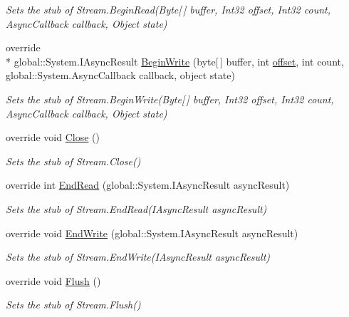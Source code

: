 \begin{DoxyCompactItemize}
\begin{DoxyCompactList}\small\item\em Sets the stub of Stream.\-Begin\-Read(\-Byte\mbox{[}$\,$\mbox{]} buffer, Int32 offset, Int32 count, Async\-Callback callback, Object state)\end{DoxyCompactList}\item 
override \\*
global\-::\-System.\-I\-Async\-Result \hyperlink{class_system_1_1_i_o_1_1_fakes_1_1_stub_stream_af14abcf21a942941c5f22cd8cb5819c6}{Begin\-Write} (byte\mbox{[}$\,$\mbox{]} buffer, int \hyperlink{jquery-1_810_82_8js_a4a9f594d20d927164551fc7fa4751a2f}{offset}, int count, global\-::\-System.\-Async\-Callback callback, object state)
\begin{DoxyCompactList}\small\item\em Sets the stub of Stream.\-Begin\-Write(\-Byte\mbox{[}$\,$\mbox{]} buffer, Int32 offset, Int32 count, Async\-Callback callback, Object state)\end{DoxyCompactList}\item 
override void \hyperlink{class_system_1_1_i_o_1_1_fakes_1_1_stub_stream_a013dfc3b38c9bf06e949c75f8d162d42}{Close} ()
\begin{DoxyCompactList}\small\item\em Sets the stub of Stream.\-Close()\end{DoxyCompactList}\item 
override int \hyperlink{class_system_1_1_i_o_1_1_fakes_1_1_stub_stream_a2db030cd9d6db31101c42a6201d5400f}{End\-Read} (global\-::\-System.\-I\-Async\-Result async\-Result)
\begin{DoxyCompactList}\small\item\em Sets the stub of Stream.\-End\-Read(\-I\-Async\-Result async\-Result)\end{DoxyCompactList}\item 
override void \hyperlink{class_system_1_1_i_o_1_1_fakes_1_1_stub_stream_a12a26c773da8a669a4f8113e4d78fe1e}{End\-Write} (global\-::\-System.\-I\-Async\-Result async\-Result)
\begin{DoxyCompactList}\small\item\em Sets the stub of Stream.\-End\-Write(\-I\-Async\-Result async\-Result)\end{DoxyCompactList}\item 
override void \hyperlink{class_system_1_1_i_o_1_1_fakes_1_1_stub_stream_a14d6b9704b60f1c2a148af700dca57a9}{Flush} ()
\begin{DoxyCompactList}\small\item\em Sets the stub of Stream.\-Flush()\end{DoxyCompactList}\item 

\end{DoxyCompactItemize}
